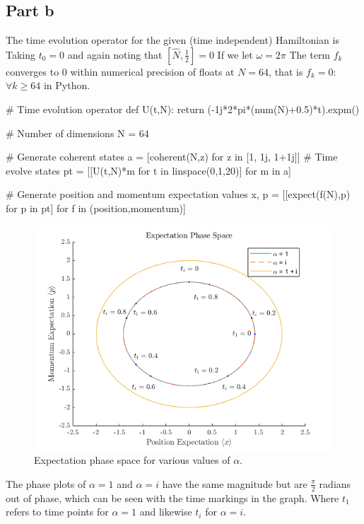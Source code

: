 \subsection*{Part b}
The time evolution operator for the given (time independent) Hamiltonian is
Taking $t_0 = 0$ and again noting that $[ \hat{N}, \frac{1}{2} ] = 0$
If we let $\omega = 2\pi$ 
The term $f_k$ converges to $0$ within numerical precision of floats at $N = 64$, that is $f_k = 0:$ $ \forall k \geq 64$ in Python.
\begin{python}
# Time evolution operator
def U(t,N):
    return (-1j*2*pi*(num(N)+0.5)*t).expm()

# Number of dimensions
N = 64

# Generate coherent states
a = [coherent(N,z) for z in [1, 1j, 1+1j]]
# Time evolve states
pt = [[U(t,N)*m for t in linspace(0,1,20)] for m in a]

# Generate position and momentum expectation values
x, p = [[expect(f(N),p) for p in pt] for f in (position,momentum)]
\end{python}
\begin{figure}[h]
    \centering
    \includegraphics[width=1\linewidth]{Resources//245//Homework 5/245 Homework 5 Problem 2b.png}
    \caption{Expectation phase space for various values of $\alpha$.}
    \label{fig:enter-label}
\end{figure}
\pagebreak
The phase plots of $\alpha = 1$ and $\alpha = i$ have the same magnitude but are $\frac{\pi}{2}$ radians out of phase, which can be seen with the time markings in the graph. Where $t_1$ refers to time points for $\alpha = 1$ and likewise $t_i$ for $\alpha = i$.
